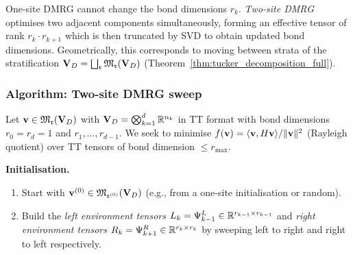 One-site DMRG cannot change the bond dimensions $r_k$. \emph{Two-site
DMRG} optimises two adjacent components simultaneously, forming an
effective tensor of rank $r_k \cdot r_{k+1}$ which is then truncated
by SVD to obtain updated bond dimensions. Geometrically, this
corresponds to moving between strata of the stratification
$\mathbf{V}_D = \bigsqcup_{\mathfrak{r}} \mathfrak{M}_{\mathfrak{r}}(\mathbf{V}_D)$
(Theorem~\ref{thm:tucker_decomposition_full}).

\subsubsection*{Algorithm: Two-site DMRG sweep}

Let $\mathbf{v} \in \mathfrak{M}_{\mathfrak{r}}(\mathbf{V}_D)$ with $\mathbf{V}_D = \bigotimes_{k=1}^d \mathbb{R}^{n_k}$
in TT format with bond dimensions $r_0 = r_d = 1$ and
$r_1, \ldots, r_{d-1}$. We seek to minimise $f(\mathbf{v}) = \langle \mathbf{v},
H\mathbf{v}\rangle / \|\mathbf{v}\|^2$ (Rayleigh quotient) over TT tensors of bond
dimension $\leq r_{\max}$.

\medskip
\noindent\textbf{Initialisation.}
\begin{enumerate}
\item Start with $\mathbf{v}^{(0)} \in \mathfrak{M}_{\mathfrak{r}^{(0)}}(\mathbf{V}_D)$ (e.g., from
    a one-site initialisation or random).
\item Build the \emph{left environment tensors}
    $L_k = \Psi_{k-1}^L \in \mathbb{R}^{r_{k-1} \times r_{k-1}}$
    and \emph{right environment tensors}
    $R_k = \Psi_{k+1}^R \in \mathbb{R}^{r_k \times r_k}$ by sweeping left
    to right and right to left respectively.
\end{enumerate}

